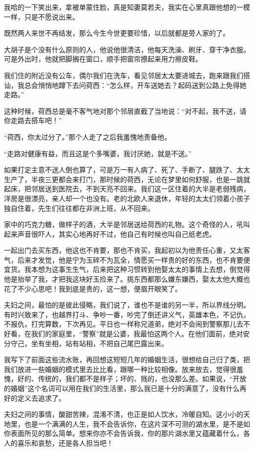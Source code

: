\par 我哈的一下笑出来，拿被单蒙住脸，真是知妻莫若夫，我实在心里真跟他想的一模一样，只是不愿说出来。
\par 既然两人来世不再结发，那么今生今世更要珍惜，以后就都是旁人家的了。
\par 大胡子是个没有什么原则的人，他说他很清洁，他每天洗澡、刷牙、穿干净衣服。可是外出时，他就把脚搁在窗口，顺手把窗帘撩起来用力擦皮鞋。
\par 我们住的附近没有公车，偶尔我们在洗车，看见邻居太太要进城去，跑来跟我们搭讪，我总会悄悄地蹲下去问荷西：“怎么样，开车送她去？起码送到公路上免得她走路。”
\par 这种时候，荷西总是毫不客气地对那个邻居直截了当地说：“对不起，我不送，请你走路去搭车吧！”
\par “荷西，你太过分了。”那个人走了之后我羞愧地责备他。
\par “走路对健康有益，而且这是个多嘴婆，我讨厌她，就是不送。”
\par 如果打定主意不送人倒也算了，可是万一有人病了、死了、手断了、腿跌了、太太生产了，半夜三更都会来打门，那时候的荷西，无论在梦里如何舒服，也是一跳就起床，把邻居送到医院去，不到天亮不回来。我们这一区住着的大半是老弱残病，洋房是很漂亮，亲人却一个也没有。老的北欧人来退休，年轻的太太们领着小孩子独自住着，先生们往往都在非洲上班，从不回来。
\par 家中的巧克力糖，做样子的酒，大半是邻居送给荷西的礼物。这个奇怪的人，吼叫起来声音很吓人，其实心地再好不过，他自己有时候也叫自己纸老虎。
\par 一起出门去买东西，他这也不肯要，那也不肯买，我起初以为他责任心重，又太客气，后来才发觉，他是宁为玉碎不为瓦全，情愿买一样贵的好的东西，也不肯要便宜货。我本想为这事生生气，后来把这种习惯转到他娶太太的事情上去想，倒觉得他是抬举了我，才把我这块好玉捡来了。挑东西都那么嫌东嫌西，娶太太他大概也花了不少心思吧！我到底是贵的，这一想，便眉开眼笑了。
\par 夫妇之间，最怕的是彼此侵略，我们说了，谁也不是谁的另一半，所以界线分明。有时兴致来了，也越界打斗、争吵一番，吵完了倒还讲义气，英雄本色，不记仇，不报仇，打完算数，下次再见。平日也一样称兄道弟，绝对不会闹到警察那儿去不好看，在我们的家庭里，“警察”就是公婆，我最怕这两个人。在他们面前，绝对安分守己，坐有坐相，站有站相，不把自己尾巴露出来。
\par 我写下了前面这些流水账，再回想这短短几年的婚姻生活，很想给自己归了类，把我们放进一些婚姻的模式里去比比看，跟哪一种比较相像。放来放去，觉得很羞愧，好的、传统的，我们都不是样子；坏的、贱的，也没那么差。如果说，“开放的婚姻”这个名词可以用在我们的生活里，那么我已是十分的满意了，没有什么再好的定义去追求了。
\par 夫妇之间的事情，酸甜苦辣，混淆不清，也正是如人饮水，冷暖自知。这小小的天地里，也是一个满满的人生，我不会告诉你，在这片深不可测的湖水里，是不是如你表面所见的那么简单。想来你亦不会告诉我，你的那片湖水里又蕴藏着什么，各人的喜乐和哀愁，还是各人担当吧！



